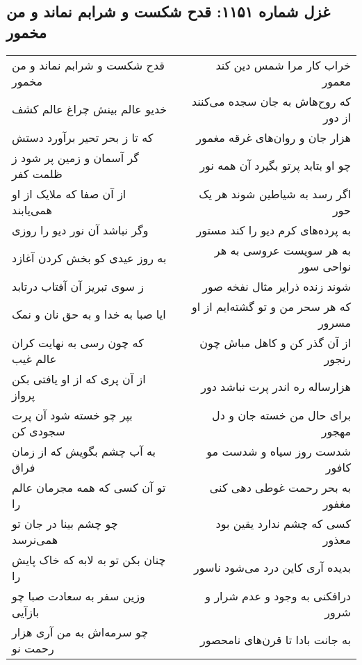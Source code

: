 \begin{center}
\section*{غزل شماره ۱۱۵۱: قدح شکست و شرابم نماند و من مخمور}
\label{sec:1151}
\begin{longtable}{l p{0.5cm} r}
قدح شکست و شرابم نماند و من مخمور
&&
خراب کار مرا شمس دین کند معمور
\\
خدیو عالم بینش چراغ عالم کشف
&&
که روح‌هاش به جان سجده می‌کنند از دور
\\
که تا ز بحر تحیر برآورد دستش
&&
هزار جان و روان‌های غرقه مغمور
\\
گر آسمان و زمین پر شود ز ظلمت کفر
&&
چو او بتابد پرتو بگیرد آن همه نور
\\
از آن صفا که ملایک از او همی‌یابند
&&
اگر رسد به شیاطین شوند هر یک حور
\\
وگر نباشد آن نور دیو را روزی
&&
به پرده‌های کرم دیو را کند مستور
\\
به روز عیدی کو بخش کردن آغازد
&&
به هر سویست عروسی به هر نواحی سور
\\
ز سوی تبریز آن آفتاب درتابد
&&
شوند زنده ذرایر مثال نفخه صور
\\
ایا صبا به خدا و به حق نان و نمک
&&
که هر سحر من و تو گشته‌ایم از او مسرور
\\
که چون رسی به نهایت کران عالم غیب
&&
از آن گذر کن و کاهل مباش چون رنجور
\\
از آن پری که از او یافتی بکن پرواز
&&
هزارساله ره اندر پرت نباشد دور
\\
بپر چو خسته شود آن پرت سجودی کن
&&
برای حال من خسته جان و دل مهجور
\\
به آب چشم بگویش که از زمان فراق
&&
شدست روز سیاه و شدست مو کافور
\\
تو آن کسی که همه مجرمان عالم را
&&
به بحر رحمت غوطی دهی کنی مغفور
\\
چو چشم بینا در جان تو همی‌نرسد
&&
کسی که چشم ندارد یقین بود معذور
\\
چنان بکن تو به لابه که خاک پایش را
&&
بدیده آری کاین درد می‌شود ناسور
\\
وزین سفر به سعادت صبا چو بازآیی
&&
درافکنی به وجود و عدم شرار و شرور
\\
چو سرمه‌اش به من آری هزار رحمت نو
&&
به جانت بادا تا قرن‌های نامحصور
\\
\end{longtable}
\end{center}
